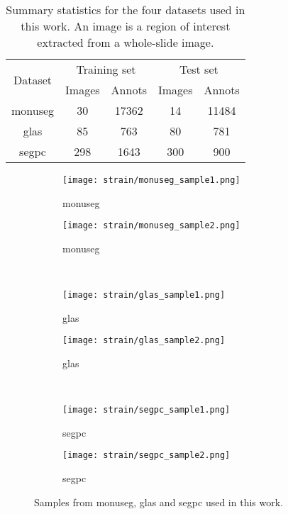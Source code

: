 \begin{table}
  \caption{Summary statistics for the four datasets used in this work. An image is a region of interest extracted from a whole-slide image.}
  \centering
  \begin{tabular}{|c|cc|cc|}
    \hline
    \multirow{2}{*}{Dataset} & \multicolumn{2}{c|}{Training set} & \multicolumn{2}{c|}{Test set}\\
    & Images & Annots    & Images & Annots  \\
    \hline
    \acrshort{monuseg} & 30 & 17362 & 14 & 11484\\
    \acrshort{glas} & 85 & 763 & 80 & 781 \\
    \acrshort{segpc} & 298 & 1643 & 300 & 900 \\
    \hline
  \end{tabular}
  \label{tab:strain:datasets_statistics}
\end{table}


\begin{figure}
  \centering
  \begin{subfigure}{0.48\textwidth}
    \centering
    \texttt{[image: strain/monuseg\_sample1.png]}
    \caption{\acrshort{monuseg}}
    \label{sfig:strain:monuseg_sample1}
  \end{subfigure}
  \begin{subfigure}{0.48\textwidth}
    \centering
    \texttt{[image: strain/monuseg\_sample2.png]}
    \caption{\acrshort{monuseg}}
    \label{sfig:strain:monuseg_sample2}
  \end{subfigure} \\

  \begin{subfigure}{0.48\textwidth}
    \centering
    \texttt{[image: strain/glas\_sample1.png]}
    \caption{\acrshort{glas}}
    \label{sfig:strain:glas_sample1}
  \end{subfigure}
  \begin{subfigure}{0.48\textwidth}
    \centering
    \texttt{[image: strain/glas\_sample2.png]}
    \caption{\acrshort{glas}}
    \label{sfig:strain:glas_sample2}
  \end{subfigure} \\

  \begin{subfigure}{0.48\textwidth}
    \centering
    \texttt{[image: strain/segpc\_sample1.png]}
    \caption{\acrshort{segpc}}
    \label{sfig:strain:segpc_sample1}
  \end{subfigure}
  \begin{subfigure}{0.48\textwidth}
    \centering
    \texttt{[image: strain/segpc\_sample2.png]}
    \caption{\acrshort{segpc}}
    \label{sfig:strain:segpc_sample2}
  \end{subfigure} 
  
  \caption{Samples from \acrshort{monuseg}, \acrshort{glas} and \acrshort{segpc} used in this work.}
  \label{fig:strain:datasets_samples}
\end{figure}

